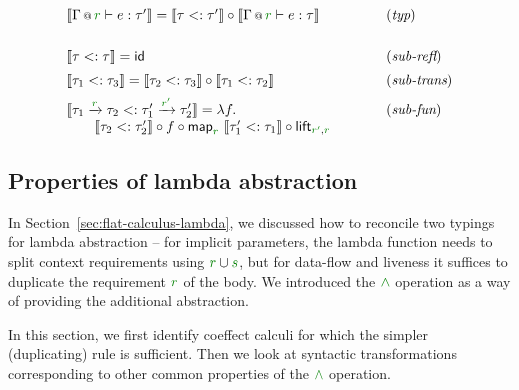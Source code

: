
\begin{figure}[t]

\begin{equation*}
\begin{array}{lll}
\sem{\coctx{\Gamma}{\cclrd{r}} \vdash e : \tau' } = 
  \sem{\tau <: \tau'} \circ \sem{\coctx{\Gamma}{\cclrd{r}} \vdash e : \tau } &\qquad& (\emph{typ})
\\[1.75em]  
\sem{\tau <: \tau} = \ident{id} && (\emph{sub-refl})
\\[0.5em]
\sem{\tau_1 <: \tau_3} = \sem{\tau_2 <: \tau_3} \circ \sem{\tau_1 <: \tau_2} && (\emph{sub-trans})
\\[0.5em]
\sem{\tau_1 \xrightarrow{\cclrd{r}} \tau_2 <: \tau_1' \xrightarrow{\cclrd{r'}} \tau_2'} = \lambda f. && (\emph{sub-fun}) \\
\qquad\sem{\tau_2 <: \tau_2'} \circ f \circ \ident{map}_{\cclrd{r}}~\sem{\tau_1' <: \tau_1} 
  \circ \ident{lift}_{\cclrd{r'}, \cclrd{r}}
\end{array}
\end{equation*}

\label{fig:flat-semantics-sub}
\end{figure}


\subsection{Properties of lambda abstraction}
\label{sec:flat-exts-lambda}

In Section~\ref{sec:flat-calculus-lambda}, we discussed how to reconcile two typings for
lambda abstraction -- for implicit parameters, the lambda function needs to split context 
requirements using $\cclrd{r} \cup \cclrd{s}$, but for data-flow and liveness it suffices to 
duplicate the requirement $\cclrd{r}$ of the body. We introduced the $\czip$ operation as 
a way of providing the additional abstraction.

In this section, we first identify coeffect calculi for which the simpler (duplicating) 
rule is sufficient. Then we look at syntactic transformations corresponding to other common 
properties of the $\czip$ operation.

